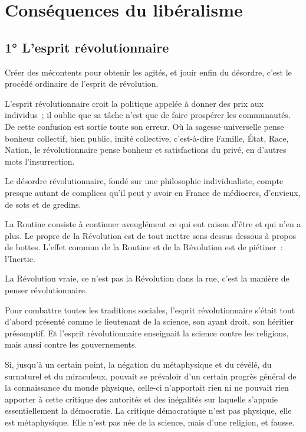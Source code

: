 \documentclass[french,twoside]{book} %
\newcommand{\astermono}{\medskip\centerline{\color{rubric}\large\selectfont{\syms ✻}}\medskip\par}%
\begin{document}
\section[{Conséquences du libéralisme}]{Conséquences du libéralisme}
\subsection[{1° L’esprit révolutionnaire}]{1° L’esprit révolutionnaire}
\noindent Créer des mécontents pour obtenir les agités, et jouir enfin du désordre, c’est le procédé ordinaire de l’esprit de révolution.\par
L’esprit révolutionnaire croit la politique appelée à donner des prix aux individus ; il oublie que sa tâche n’est que de faire prospérer les communautés. De cette confusion est sortie toute son erreur. Où la sagesse universelle pense bonheur collectif, bien public, imité collective, c’est-à-dire Famille, État, Race, Nation, le révolutionnaire pense bonheur et satisfactions du privé, en d’autres mots l’insurrection.\par

\astermono

\noindent Le désordre révolutionnaire, fondé sur une philosophie individualiste, compte presque autant de complices qu’il peut y avoir en France de médiocres, d’envieux, de sots et de gredins.\par

\astermono

\noindent La Routine consiste à continuer aveuglément ce qui eut raison d’être et qui n’en a plus. Le propre de la Révolution est de tout mettre sens dessus dessous à propos de bottes. L’effet commun de la Routine et de la Révolution est de piétiner : l’Inertie.\par

\astermono

\noindent La Révolution vraie, ce n’est pas la Révolution dans la rue, c’est la manière de penser révolutionnaire.\par

\astermono

\noindent Pour combattre toutes les traditions sociales, l’esprit révolutionnaire s’était tout d’abord présenté comme le lieutenant de la science, son ayant droit, son héritier présomptif. Et l’esprit révolutionnaire enseignait la science contre les religions, mais aussi contre les gouvernements.\par
Si, jusqu’à un certain point, la négation du métaphysique et du révélé, du surnaturel et du miraculeux, pouvait se prévaloir d’un certain progrès général de la connaissance du monde physique, celle-ci n’apportait rien ni ne pouvait rien apporter à cette critique des autorités et des inégalités sur laquelle s’appuie essentiellement la démocratie. La critique démocratique n’est pas physique, elle est métaphysique. Elle n’est pas née de la science, mais d’une religion, et fausse.
\end{document}
